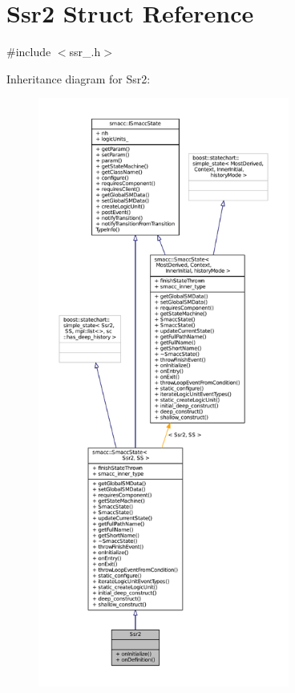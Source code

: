 \hypertarget{structSsr2}{}\section{Ssr2 Struct Reference}
\label{structSsr2}


{\ttfamily \#include $<$ssr\+\_.\+h$>$}



Inheritance diagram for Ssr2\+:
\nopagebreak
\begin{figure}[H]
\begin{center}
\leavevmode
\includegraphics[height=550pt]{structSsr2__inherit__graph}
\end{center}
\end{figure}


